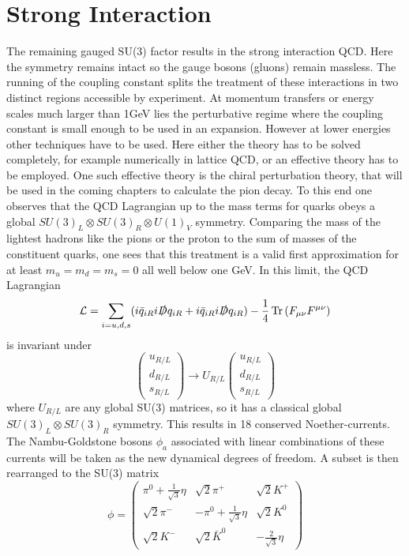 \section{Strong Interaction}
The remaining gauged SU(3) factor results in the strong interaction QCD. Here the symmetry remains intact so the gauge bosons (gluons) remain massless. The running of the coupling constant splits the treatment of these interactions in two distinct regions accessible by experiment.  At momentum transfers or energy scales much larger than 1GeV lies the perturbative regime where the coupling constant is small enough to be used in an expansion. However at lower energies other techniques have to be used. Here either the theory has to be solved completely, for example numerically in lattice QCD, or an effective theory has to be employed. One such effective theory is the chiral perturbation theory, that will be used in the coming chapters to calculate the pion decay. To this end one observes that the QCD Lagrangian up to the mass terms for quarks obeys a global $SU(3)_L\otimes SU(3)_R\otimes U(1)_V$ symmetry. Comparing the mass of the lightest hadrons like the pions or the proton to the sum of masses of the constituent quarks, one sees that this treatment is a valid first approximation for at least $m_u=m_d=m_s=0$ all well below one GeV. In this limit, the QCD Lagrangian 
\begin{equation}
\mathcal{L}=\sum_{i=u,d,s} (i\bar{q}_{iR}i\slashed{D}q_{iR}+i\bar{q}_{iR}i\slashed{D}q_{iR})-\frac{1}{4}\operatorname{Tr}\left(F_{\mu\nu}F^{\mu\nu}\right)
\end{equation}
is invariant under 
\begin{equation}
\begin{pmatrix}
u_{R/L}\\
d_{R/L}\\
s_{R/L}
\end{pmatrix}
\rightarrow
U_{R/L} \begin{pmatrix}
u_{R/L}\\
d_{R/L}\\
s_{R/L}
\end{pmatrix}
\end{equation}
where $U_{R/L}$ are any global SU(3) matrices, so it has a classical global $SU(3)_L\otimes SU(3)_R$ symmetry. This results in 18 conserved Noether-currents.
The Nambu-Goldstone bosons $\phi_a$ associated with linear combinations of these currents will be taken as the new dynamical degrees of freedom. 
A subset is then rearranged to the SU(3) matrix
\begin{equation}
\phi = \begin{pmatrix}
\pi^0+\frac{1}{\sqrt{3}}\eta & \sqrt{2}\pi^+ & \sqrt{2}K^+\\
\sqrt{2}\pi^- & -\pi^0+\frac{1}{\sqrt{3}}\eta& \sqrt{2}K^0\\
\sqrt{2}K^- & \sqrt{2}\bar{K}^0 & -\frac{2}{\sqrt{3}}\eta
\end{pmatrix}
\end{equation}
